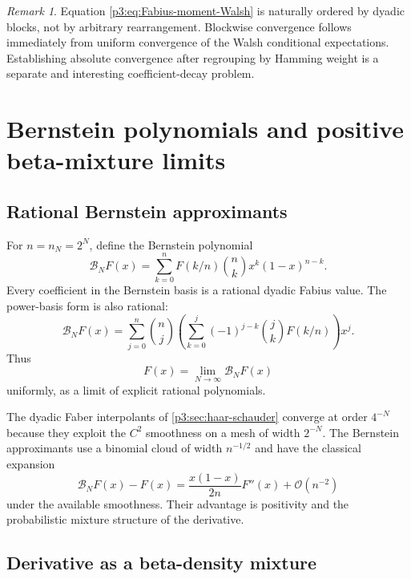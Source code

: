 \documentclass[11pt]{article}
\theoremstyle{definition}
\theoremstyle{remark}
\newtheorem{remark}[theorem]{Remark}
\newcommand{\bigO}{\mathcal O}
\begin{document}
\begin{remark}
Equation \eqref{p3:eq:Fabius-moment-Walsh} is naturally ordered by dyadic blocks,
not by arbitrary rearrangement.  Blockwise convergence follows immediately
from uniform convergence of the Walsh conditional expectations.  Establishing
absolute convergence after regrouping by Hamming weight is a separate and
interesting coefficient-decay problem.
\end{remark}

\section{Bernstein polynomials and positive beta-mixture limits}
\label{p3:sec:bernstein}

\subsection{Rational Bernstein approximants}

For $n=n_N=2^N$, define the Bernstein polynomial
\begin{equation}\label{p3:eq:Bernstein-F}
 \mathcal B_NF(x)
 =\sum_{k=0}^{n}F(k/n)\binom nkx^k(1-x)^{n-k}.
\end{equation}
Every coefficient in the Bernstein basis is a rational dyadic Fabius value.
The power-basis form is also rational:
\begin{equation}\label{p3:eq:Bernstein-power-basis}
 \mathcal B_NF(x)
 =\sum_{j=0}^{n}\binom nj
 \left(\sum_{k=0}^j(-1)^{j-k}\binom jkF(k/n)\right)x^j.
\end{equation}
Thus
\begin{equation}\label{p3:eq:F-Bernstein-limit}
 F(x)=\lim_{N\to\infty}\mathcal B_NF(x)
\end{equation}
uniformly, as a limit of explicit rational polynomials.

The dyadic Faber interpolants of \cref{p3:sec:haar-schauder} converge at order
$4^{-N}$ because they exploit the $C^2$ smoothness on a mesh of width $2^{-N}$.
The Bernstein approximants use a binomial cloud of width $n^{-1/2}$ and have the
classical expansion
\begin{equation}\label{p3:eq:Voronovskaya}
 \mathcal B_NF(x)-F(x)
 =\frac{x(1-x)}{2n}F''(x)+\bigO(n^{-2})
\end{equation}
under the available smoothness.  Their advantage is positivity and the
probabilistic mixture structure of the derivative.

\subsection{Derivative as a beta-density mixture}
\end{document}
